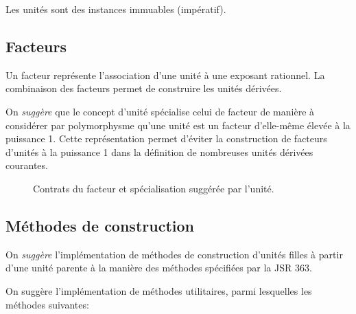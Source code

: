 \documentclass[a4paper,draft,twoside,10pt]{article}
\begin{document}
Les unités sont des instances immuables (impératif).

\subsection{Facteurs}

Un facteur représente l'association d'une unité à une exposant rationnel. La combinaison des facteurs permet de
construire les unités dérivées.

On \emph{suggère} que le concept d'unité spécialise celui de facteur de manière à considérer par polymorphysme qu'une
unité est un facteur d'elle-même élevée à la puissance 1. Cette représentation permet d'éviter la construction de
facteurs d'unités à la puissance 1 dans la définition de nombreuses unités dérivées courantes.


\begin{figure}[!h]
\caption{Contrats du facteur et spécialisation suggérée par l'unité.}
\end{figure}

\subsection{Méthodes de construction}

On \emph{suggère} l'implémentation de méthodes de construction d'unités filles à partir d'une unité parente à la manière
des méthodes spécifiées par la JSR 363.

On suggère l'implémentation de méthodes utilitaires, parmi lesquelles les méthodes suivantes:
\end{document}

